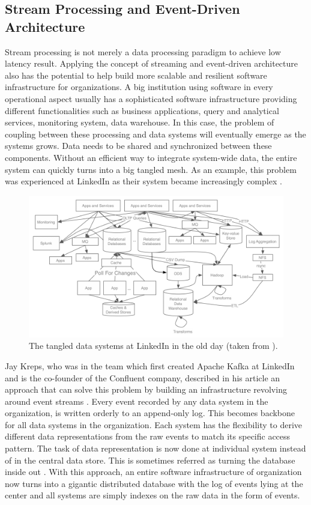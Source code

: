 \subsection{Stream Processing and Event-Driven Architecture}
Stream processing is not merely a data processing paradigm to achieve low latency result. Applying the concept of streaming and event-driven architecture also has the potential to help build more scalable and resilient software infrastructure for organizations. A big institution using software in every operational aspect usually has a sophisticated software infrastructure providing different functionalities such as business applications, query and analytical services, monitoring system, data warehouse. In this case, the problem of coupling between these processing and data systems will eventually emerge as the systems grows. Data needs to be shared and synchronized between these components. Without an efficient way to integrate system-wide data, the entire system can quickly turns into a big tangled mesh. As an example, this problem was experienced at LinkedIn as their system became increasingly complex \cite{eventstreamingplatform}. 

\begin{figure}[h]
	\centering
	\includegraphics[width=12.9cm]{images/linkedin-data-flow-ugly.png}
	\caption{The tangled data systems at LinkedIn in the old day (taken from \cite{eventstreamingplatform}).}
	\label{fig:tangledsystem}
\end{figure}

Jay Kreps, who was in the team which first created Apache Kafka at LinkedIn and is the co-founder of the Confluent company, described in his article an approach that can solve this problem by building an infrastructure revolving around event streams \cite{logjaykreps}. Every event recorded by any data system in the organization, is written orderly to an append-only log. This becomes backbone for all data systems in the organization. Each system has the flexibility to derive different data representations from the raw events to match its specific access pattern. The task of data representation is now done at individual system instead of in the central data store. This is sometimes referred as turning the database inside out \cite{kleppmann2016making}. With this approach, an entire software infrastructure of organization now turns into a gigantic distributed database with the log of events lying at the center and all systems are simply indexes on the raw data in the form of events. 

